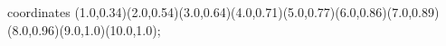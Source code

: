 					coordinates { (1.0,0.34)(2.0,0.54)(3.0,0.64)(4.0,0.71)(5.0,0.77)(6.0,0.86)(7.0,0.89)(8.0,0.96)(9.0,1.0)(10.0,1.0)};